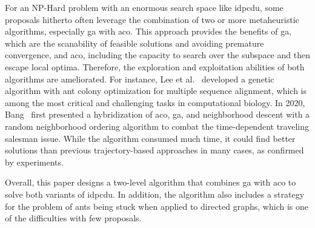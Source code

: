 For an NP-Hard problem with an enormous search space like \gls{idpcdu}, some proposals hitherto often leverage the combination of two or more metaheuristic algorithms, especially \gls{ga} with \gls{aco}. This approach provides the benefits of \gls{ga}, which are the scanability of feasible solutions and avoiding premature convergence, and \gls{aco}, including the capacity to search over the subspace and then escape local optima. Therefore, the exploration and exploitation abilities of both algorithms are ameliorated. For instance, Lee et al.~\cite{lee2008genetic} developed a genetic algorithm with ant colony optimization for multiple sequence alignment, which is among the most critical and challenging tasks in computational biology. In 2020, Bang~\cite{ban2020hybridization} first presented a hybridization of \gls{aco}, \gls{ga}, and neighborhood descent with a random neighborhood ordering algorithm to combat the time-dependent traveling salesman issue. While the algorithm consumed much time, it could find better solutions than previous trajectory-based approaches in many cases, as confirmed by experiments.  

Overall, this paper designs a two-level algorithm that combines \gls{ga} with \gls{aco} to solve both variants of \gls{idpcdu}. In addition, the algorithm also includes a strategy for the problem of ants being stuck when applied to directed graphs, which is one of the difficulties with few proposals. 